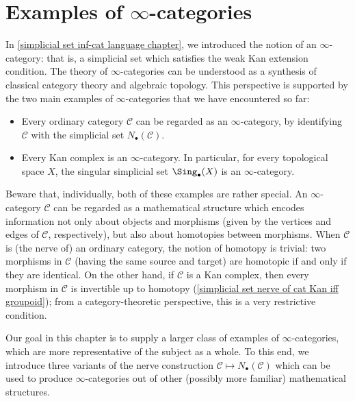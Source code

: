 \chapter{Examples of \boldmath\texorpdfstring{$\infty$}{inf}-categories}
In \cref{simplicial set inf-cat language chapter}, we introduced the notion of an $\infty$-category: that is, a simplicial set which satisfies the weak Kan extension condition. The theory of $\infty$-categories can be understood as a synthesis of classical category theory and algebraic topology. This perspective is supported by the two main examples of $\infty$-categories that we have encountered so far:
\begin{itemize}
\item Every ordinary category $\mathcal{C}$ can be regarded as an $\infty$-category, by identifying $\mathcal{C}$ with the simplicial set $N_\bullet(\mathcal{C})$.
\item Every Kan complex is an $\infty$-category. In particular, for every topological space $X$, the singular simplicial set $\Sing_\bullet(X)$ is an $\infty$-category.
\end{itemize}
Beware that, individually, both of these examples are rather special. An $\infty$-category $\mathcal{C}$ can be regarded as a mathematical structure which encodes information not only about objects and morphisms (given by the vertices and edges of $\mathcal{C}$, respectively), but also about homotopies between morphisms. When $\mathcal{C}$ is (the nerve of) an ordinary category, the notion of homotopy is trivial: two morphisms in $\mathcal{C}$ (having the same source and target) are homotopic if and only if they are identical. On the other hand, if $\mathcal{C}$ is a Kan complex, then every morphism in $\mathcal{C}$ is invertible up to homotopy (\cref{simplicial set nerve of cat Kan iff groupoid}); from a category-theoretic perspective, this is a very restrictive condition.\par
Our goal in this chapter is to supply a larger class of examples of $\infty$-categories, which are more representative of the subject as a whole. To this end, we introduce three variants of the nerve construction $\mathcal{C}\mapsto N_\bullet(\mathcal{C})$ which can be used to produce $\infty$-categories out of other (possibly more familiar) mathematical structures.

